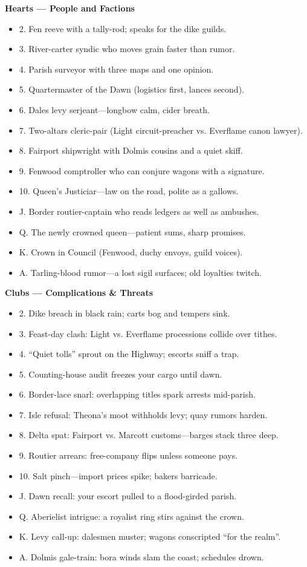 \begin{multicols}{2}
\textbf{Hearts — People and Factions}
\begin{itemize}
  \item 2. Fen reeve with a tally-rod; speaks for the dike guilds.
  \item 3. River-carter syndic who moves grain faster than rumor.
  \item 4. Parish surveyor with three maps and one opinion.
  \item 5. Quartermaster of the Dawn (logistics first, lances second).
  \item 6. Dales levy serjeant—longbow calm, cider breath.
  \item 7. Two-altars cleric-pair (Light circuit-preacher vs. Everflame canon lawyer).
  \item 8. Fairport shipwright with Dolmis cousins and a quiet skiff.
  \item 9. Fenwood comptroller who can conjure wagons with a signature.
  \item 10. Queen's Justiciar—law on the road, polite as a gallows.
  \item J. Border routier-captain who reads ledgers as well as ambushes.
  \item Q. The newly crowned queen—patient sums, sharp promises.
  \item K. Crown in Council (Fenwood, duchy envoys, guild voices).
  \item A. Tarling-blood rumor—a lost sigil surfaces; old loyalties twitch.
\end{itemize}

\textbf{Clubs — Complications \& Threats}
\begin{itemize}
  \item 2. Dike breach in black rain; carts bog and tempers sink.
  \item 3. Feast-day clash: Light vs. Everflame processions collide over tithes.
  \item 4. “Quiet tolls” sprout on the Highway; escorts sniff a trap.
  \item 5. Counting-house audit freezes your cargo until dawn.
  \item 6. Border-lace snarl: overlapping titles spark arrests mid-parish.
  \item 7. Isle refusal: Theona’s moot withholds levy; quay rumors harden.
  \item 8. Delta spat: Fairport vs. Marcott customs—barges stack three deep.
  \item 9. Routier arrears: free-company flips unless someone pays.
  \item 10. Salt pinch—import prices spike; bakers barricade.
  \item J. Dawn recall: your escort pulled to a flood-girded parish.
  \item Q. Aberielist intrigue: a royalist ring stirs against the crown.
  \item K. Levy call-up: dalesmen muster; wagons conscripted “for the realm”.
  \item A. Dolmis gale-train: bora winds slam the coast; schedules drown.
\end{itemize}


\end{multicols}
